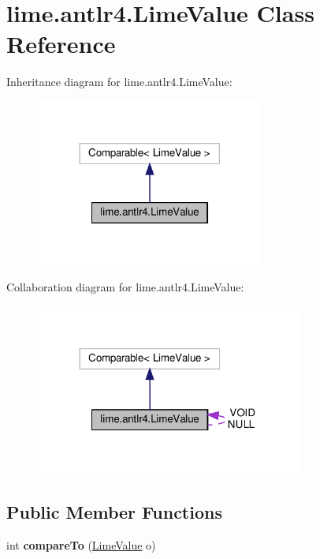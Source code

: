 \hypertarget{classlime_1_1antlr4_1_1LimeValue}{}\section{lime.\+antlr4.\+Lime\+Value Class Reference}
\label{classlime_1_1antlr4_1_1LimeValue}


Inheritance diagram for lime.\+antlr4.\+Lime\+Value\+:
\nopagebreak
\begin{figure}[H]
\begin{center}
\leavevmode
\includegraphics[width=213pt]{classlime_1_1antlr4_1_1LimeValue__inherit__graph}
\end{center}
\end{figure}


Collaboration diagram for lime.\+antlr4.\+Lime\+Value\+:
\nopagebreak
\begin{figure}[H]
\begin{center}
\leavevmode
\includegraphics[width=248pt]{classlime_1_1antlr4_1_1LimeValue__coll__graph}
\end{center}
\end{figure}
\subsection*{Public Member Functions}
\begin{DoxyCompactItemize}
\item 
\mbox{\label{classlime_1_1antlr4_1_1LimeValue_a443f1733e5b4063e559af82b64864c74}} 
int {\bfseries compare\+To} (\hyperlink{classlime_1_1antlr4_1_1LimeValue}{Lime\+Value} o)
\end{DoxyCompactItemize}
